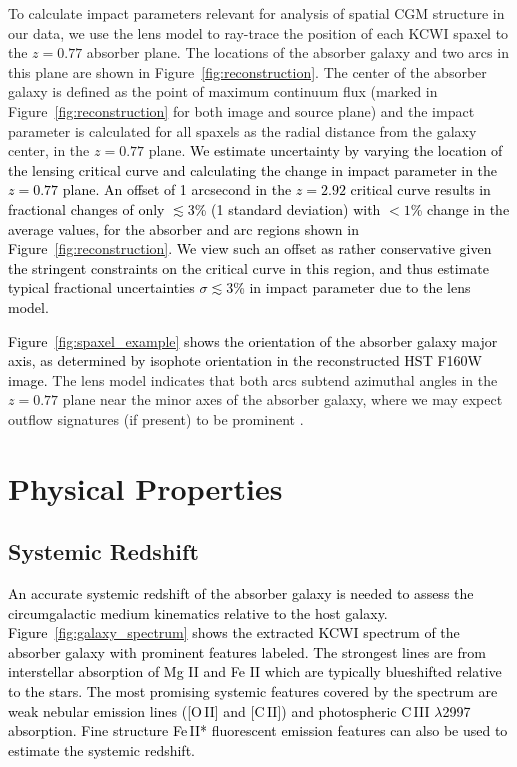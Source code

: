 \documentclass[twocolumn]{aastex62}
\newcommand{\MgII}{Mg\tiny{ }\footnotesize{II}\normalsize{ }}
\newcommand{\FeII}{Fe\tiny{ }\footnotesize{II}\normalsize{ }}
\newcommand{\TJ}[1]{\textcolor{blue}{TJ: #1}}
\newcommand{\comment}[1]{\textcolor{black}{#1}}
\begin{document}
To calculate impact parameters relevant for analysis of spatial CGM structure in our data, we use the lens model to ray-trace the position of each KCWI spaxel to the $z=0.77$ absorber plane. The locations of the absorber galaxy and two arcs in this plane are shown in Figure~\ref{fig:reconstruction}. The center of the absorber galaxy is defined as the point of maximum continuum flux (marked in Figure~\ref{fig:reconstruction} for both image and source plane) and the impact parameter is calculated for all spaxels as the radial distance from the galaxy center, in the $z=0.77$ plane. 
\comment{We estimate uncertainty by varying the location of the lensing critical curve and calculating the change in impact parameter in the $z=0.77$ plane. An offset of 1 arcsecond in the $z=2.92$ critical curve results in fractional changes of only $\lesssim3$\% (1 standard deviation) with $<1$\% change in the average values, for the absorber and arc regions shown in Figure~\ref{fig:reconstruction}. We view such an offset as rather conservative given the stringent constraints on the critical curve in this region, and thus estimate typical fractional uncertainties $\sigma \lesssim 3$\% in impact parameter due to the lens model. }

\comment{Figure~\ref{fig:spaxel_example} shows the orientation of the absorber galaxy major axis, as determined by isophote orientation in the reconstructed HST F160W image.} 
The lens model indicates that both arcs subtend azimuthal angles in the $z=0.77$ plane near the minor axes of the absorber galaxy, where we may expect outflow signatures (if present) to be prominent \citep[e.g.,][]{Martin2019,LanMo2018}. 




\section{Physical Properties} \label{sec:analysis}


\subsection{Systemic Redshift}


\textcolor{black}{An accurate systemic redshift of the absorber galaxy is needed to assess the circumgalactic medium kinematics relative to the host galaxy. Figure~\ref{fig:galaxy_spectrum} shows the extracted KCWI spectrum of the absorber galaxy with prominent features labeled. The strongest lines are from interstellar absorption of \MgII and \FeII which are typically blueshifted relative to the stars. The most promising systemic features covered by the spectrum are weak nebular emission lines ([O\,II] and [C\,II]) and photospheric C\,III $\lambda$2997 absorption. Fine structure Fe\,II* fluorescent emission features can also be used to estimate the systemic redshift. }
\end{document}
